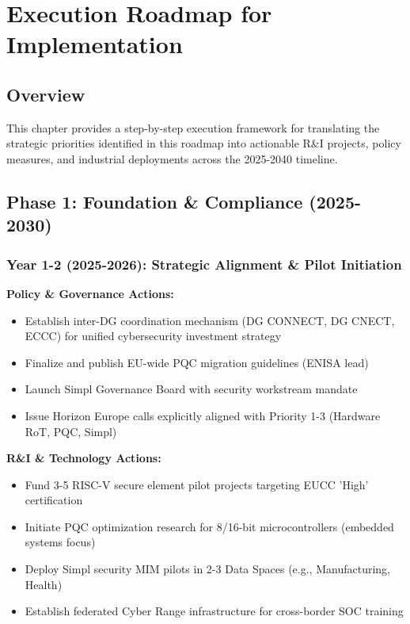 \documentclass{ieeeaccess}
\begin{document}
\newpage
\section{Execution Roadmap for Implementation}

\subsection*{Overview}
This chapter provides a step-by-step execution framework for translating the strategic priorities identified in this roadmap into actionable R\&I projects, policy measures, and industrial deployments across the 2025-2040 timeline.

\subsection*{Phase 1: Foundation \& Compliance (2025-2030)}

\subsubsection*{Year 1-2 (2025-2026): Strategic Alignment \& Pilot Initiation}
\textbf{Policy \& Governance Actions:}
\begin{itemize}
    \item Establish inter-DG coordination mechanism (DG CONNECT, DG CNECT, ECCC) for unified cybersecurity investment strategy
    \item Finalize and publish EU-wide PQC migration guidelines (ENISA lead)
    \item Launch Simpl Governance Board with security workstream mandate
    \item Issue Horizon Europe calls explicitly aligned with Priority 1-3 (Hardware RoT, PQC, Simpl)
\end{itemize}

\textbf{R\&I \& Technology Actions:}
\begin{itemize}
    \item Fund 3-5 RISC-V secure element pilot projects targeting EUCC 'High' certification
    \item Initiate PQC optimization research for 8/16-bit microcontrollers (embedded systems focus)
    \item Deploy Simpl security MIM pilots in 2-3 Data Spaces (e.g., Manufacturing, Health)
    \item Establish federated Cyber Range infrastructure for cross-border SOC training
\end{itemize}
\end{document}
